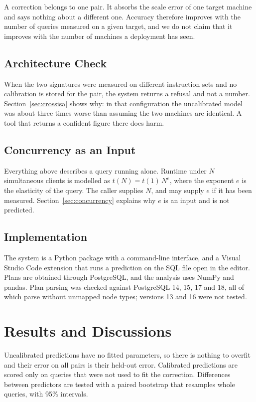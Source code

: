 \documentclass[runningheads]{llncs}
\begin{document}
A correction belongs to one pair. It absorbs the scale error of one target
machine and says nothing about a different one. Accuracy therefore improves
with the number of queries measured on a given target, and we do not claim
that it improves with the number of machines a deployment has seen.

\subsection{Architecture Check}

When the two signatures were measured on different instruction sets and no
calibration is stored for the pair, the system returns a refusal and not a
number. Section~\ref{sec:crossisa} shows why: in that configuration the
uncalibrated model was about three times worse than assuming the two machines
are identical. A tool that returns a confident figure there does harm.

\subsection{Concurrency as an Input}

Everything above describes a query running alone. Runtime under $N$
simultaneous clients is modelled as $t(N) = t(1)\,N^{e}$, where the exponent
$e$ is the elasticity of the query. The caller supplies $N$, and may supply
$e$ if it has been measured. Section~\ref{sec:concurrency} explains why $e$
is an input and is not predicted.

\subsection{Implementation}

The system is a Python package with a command-line interface, and a Visual
Studio Code extension that runs a prediction on the SQL file open in the
editor. Plans are obtained through PostgreSQL, and the analysis uses NumPy
and pandas. Plan parsing was checked against PostgreSQL 14, 15, 17 and 18,
all of which parse without unmapped node types; versions 13 and 16 were not
tested.

\section{Results and Discussions}

Uncalibrated predictions have no fitted parameters, so there is nothing to
overfit and their error on all pairs is their held-out error. Calibrated
predictions are scored only on queries that were not used to fit the
correction. Differences between predictors are tested with a paired
bootstrap that resamples whole queries, with 95\% intervals.
\end{document}
